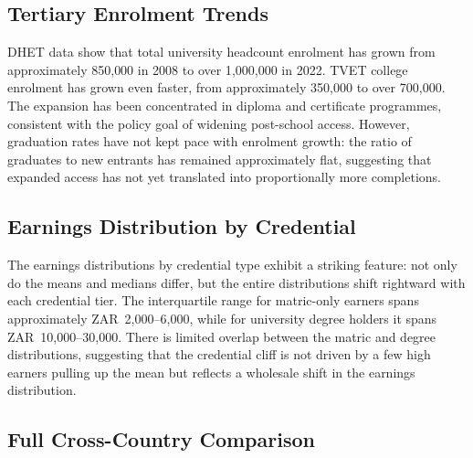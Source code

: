 \documentclass[12pt]{article}
\begin{document}
\subsection{Tertiary Enrolment Trends}

DHET data show that total university headcount enrolment has grown from approximately 850{,}000 in 2008 to over 1{,}000{,}000 in 2022. TVET college enrolment has grown even faster, from approximately 350{,}000 to over 700{,}000. The expansion has been concentrated in diploma and certificate programmes, consistent with the policy goal of widening post-school access. However, graduation rates have not kept pace with enrolment growth: the ratio of graduates to new entrants has remained approximately flat, suggesting that expanded access has not yet translated into proportionally more completions.

\subsection{Earnings Distribution by Credential}

The earnings distributions by credential type exhibit a striking feature: not only do the means and medians differ, but the entire distributions shift rightward with each credential tier. The interquartile range for matric-only earners spans approximately ZAR~2{,}000--6{,}000, while for university degree holders it spans ZAR~10{,}000--30{,}000. There is limited overlap between the matric and degree distributions, suggesting that the credential cliff is not driven by a few high earners pulling up the mean but reflects a wholesale shift in the earnings distribution.


\subsection{Full Cross-Country Comparison}
\end{document}
